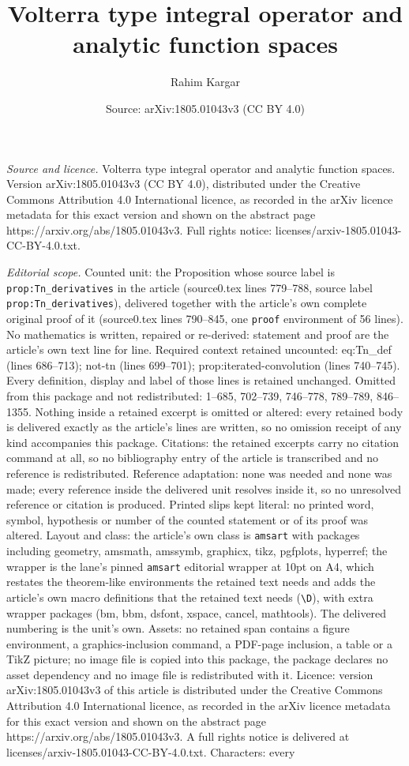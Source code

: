 \documentclass[10pt,a4paper]{amsart}
\title[Volterra type integral operator and analytic function spaces]{Volterra type integral operator and analytic function spaces}
\author{Rahim Kargar}
\date{Source: arXiv:1805.01043v3 (CC BY 4.0)}
\begin{document}
\maketitle

\noindent\emph{Source and licence.} Volterra type integral operator and analytic function spaces. Version arXiv:1805.01043v3 (CC BY 4.0), distributed under the Creative Commons Attribution 4.0 International licence, as recorded in the arXiv licence metadata for this exact version and shown on the abstract page https://arxiv.org/abs/1805.01043v3. Full rights notice: licenses/arxiv-1805.01043-CC-BY-4.0.txt.\par\smallskip

\noindent\textit{Editorial scope.} Counted unit: the Proposition whose source label is \texttt{prop:Tn\_derivatives} in the article (source0.tex lines 779--788, source label \texttt{prop:Tn\_derivatives}), delivered together with the article's own complete original proof of it (source0.tex lines 790--845, one \texttt{proof} environment of 56 lines). No mathematics is written, repaired or re-derived: statement and proof are the article's own text line for line. Required context retained uncounted: eq:Tn\_def (lines 686--713); not-tn (lines 699--701); prop:iterated-convolution (lines 740--745). Every definition, display and label of those lines is retained unchanged. Omitted from this package and not redistributed: 1--685, 702--739, 746--778, 789--789, 846--1355. Nothing inside a retained excerpt is omitted or altered: every retained body is delivered exactly as the article's lines are written, so no omission receipt of any kind accompanies this package. Citations: the retained excerpts carry no citation command at all, so no bibliography entry of the article is transcribed and no reference is redistributed. Reference adaptation: none was needed and none was made; every reference inside the delivered unit resolves inside it, so no unresolved reference or citation is produced. Printed slips kept literal: no printed word, symbol, hypothesis or number of the counted statement or of its proof was altered. Layout and class: the article's own class is \texttt{amsart} with packages including geometry, amsmath, amssymb, graphicx, tikz, pgfplots, hyperref; the wrapper is the lane's pinned \texttt{amsart} editorial wrapper at 10pt on A4, which restates the theorem-like environments the retained text needs and adds the article's own macro definitions that the retained text needs (\texttt{\textbackslash D}), with extra wrapper packages (bm, bbm, dsfont, xspace, cancel, mathtools). The delivered numbering is the unit's own. Assets: no retained span contains a figure environment, a graphics-inclusion command, a PDF-page inclusion, a table or a TikZ picture; no image file is copied into this package, the package declares no asset dependency and no image file is redistributed with it. Licence: version arXiv:1805.01043v3 of this article is distributed under the Creative Commons Attribution 4.0 International licence, as recorded in the arXiv licence metadata for this exact version and shown on the abstract page https://arxiv.org/abs/1805.01043v3. A full rights notice is delivered at licenses/arxiv-1805.01043-CC-BY-4.0.txt. Characters: every 
\end{document}
